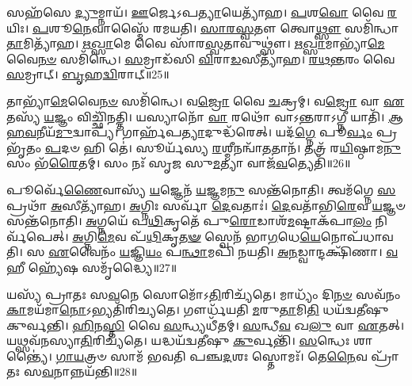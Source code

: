 𑌸𑌹᳴𑌸𑍇 \ul{𑌦𑍍𑌯𑍁}\-𑌮𑍍𑌨𑌾𑌯᳴।
\-\ul{𑌊}\-𑌰𑍍𑌜𑍇\-𑌽𑌪\-\ul{𑌤𑍍𑌯𑌾}\-𑌯𑍇𑌤𑍍𑌯𑌾᳴𑌹।
\-\ul{𑌪}\-𑌶\-\ul{𑌵𑍋} 𑌵𑍈 \ul{𑌰}\-𑌯𑌿𑌃।
\-\ul{𑌪}\-𑌶𑍂\-\ul{𑌨𑍇}\-𑌵𑌾𑌸𑍍𑌮𑍈᳴ 𑌰𑌮𑌯𑌤𑌿।
\-\ul{𑌸𑌾}\-\-\ul{𑌰}\-\-\ul{𑌸𑍍𑌵}\-𑌤𑍗 𑌤𑍍𑌵𑍋\-\ul{𑌥𑍍𑌸𑍗} 𑌸𑌮𑌿᳴𑌨𑍍𑌧𑌾\-\ul{𑌤𑌾}\-𑌮𑌿𑌤𑍍𑌯𑌾᳴𑌹।
\-\ul{𑌋}\-\-\ul{𑌖𑍍𑌸𑌾}\-𑌮𑍇 𑌵𑍈 𑌸𑌾᳴𑌰\-\ul{𑌸𑍍𑌵}\-𑌤𑌾𑌵𑍁𑌥𑍍𑌸𑍗॑।
\-\ul{𑌋}\-\-\ul{𑌖𑍍𑌸𑌾}\-𑌮𑌾𑌭𑍍𑌯𑌾᳴\-\ul{𑌮𑍇}\-𑌵𑍈\-\ul{𑌨}\-\-\ul{𑍞} 𑌸𑌮𑌿᳴𑌨𑍍𑌧𑍇।
\-\ul{𑌸}\-𑌮𑍍𑌰𑌾𑌡᳴𑌸𑌿 \ul{𑌵𑌿}\-𑌰𑌾\-\ul{𑌡}\-𑌸𑍀𑌤𑍍𑌯𑌾᳴𑌹।
\-\ul{𑌰}\-\-\ul{𑌥}\-\-\ul{𑌨𑍍𑌤}\-𑌰𑌂 𑌵𑍈 \ul{𑌸}\-𑌮𑍍𑌰𑌾𑌟𑍍।
\-\ul{𑌬𑍃}\-𑌹\-\ul{𑌦𑍍𑌵𑌿}\-𑌰𑌾𑌟𑍍॥25॥

𑌤𑌾𑌭𑍍𑌯𑌾᳴\-\ul{𑌮𑍇}\-𑌵𑍈\-\ul{𑌨}\-\-\ul{𑍞} 𑌸𑌮𑌿᳴𑌨𑍍𑌧𑍇।
𑌵\-\ul{𑌜𑍍𑌰𑍋} 𑌵𑍈 \ul{𑌚}\-𑌕𑍍𑌰𑌮𑍍।
𑌵\-\ul{𑌜𑍍𑌰𑍋} 𑌵𑌾 \ul{𑌏}\-𑌤𑌸𑍍𑌯᳴ \ul{𑌯}\-𑌜𑍍𑌞𑌂 𑌵𑌿𑌚𑍍𑌛𑌿᳴𑌨𑌤𑍍𑌤𑌿।
𑌯𑌸𑍍𑌯𑌾𑌨𑍋᳴ \ul{𑌵𑌾} 𑌰𑌥𑍋᳴ 𑌵𑌾𑌽\-\ul{𑌨𑍍𑌤}\-𑌰𑌾\-𑌽𑌗𑍍𑌨𑍀 𑌯𑌾𑌤𑌿᳴।
\-\ul{𑌆}\-\-\ul{𑌹}\-\-\ul{𑌵}\-𑌨𑍀𑌯᳴\-\ul{𑌮𑍁}\-𑌦𑍍𑌵𑌾𑌪𑍍𑌯᳴।
𑌗𑌾𑌰𑍍\mbox{}𑌹᳴𑌪\-\ul{𑌤𑍍𑌯𑌾}\-𑌦𑍁𑌦𑍍𑌧᳴𑌰𑍇𑌤𑍍।
𑌯𑌦᳴\-\ul{𑌗𑍍𑌨𑍇} 𑌪𑍂\-\ul{𑌰𑍍𑌵𑌂} 𑌪𑍍𑌰𑌭𑍃᳴𑌤𑌂 \ul{𑌪}\-𑌦𑍞 𑌹𑌿 𑌤𑍇॑।
𑌸𑍂𑌰𑍍𑌯᳴𑌸𑍍𑌯 \ul{𑌰}\-𑌶𑍍𑌮𑍀𑌨𑌨𑍍𑌵𑌾᳴\-\ul{𑌤}\-𑌤𑌾𑌨᳴।
𑌤𑌤𑍍𑌰᳴ 𑌰\-\ul{𑌯𑌿}\-𑌷𑍍𑌠𑌾𑌮\-\ul{𑌨𑍁} 𑌸𑌂 𑌭᳴\-\ul{𑌰𑍈}\-𑌤𑌮𑍍।
𑌸𑌂 𑌨𑌃᳴ 𑌸𑍃𑌜 𑌸𑍁\-\ul{𑌮}\-𑌤𑍍𑌯𑌾 𑌵𑌾𑌜᳴\-\ul{𑌵}\-𑌤𑍍𑌯𑍇𑌤𑌿᳴॥26॥

𑌪𑍂𑌰𑍍𑌵𑍇᳴\-\ul{𑌣𑍈}\-𑌵𑌾𑌸𑍍𑌯᳴ \ul{𑌯}\-𑌜𑍍𑌞𑍇𑌨᳴ \ul{𑌯}\-𑌜𑍍𑌞𑌮\-\ul{𑌨𑍁} 𑌸𑌨𑍍𑌤᳴𑌨𑍋𑌤𑌿।
𑌤𑍍𑌵𑌮᳴𑌗𑍍𑌨𑍇 \ul{𑌸}\-𑌪𑍍𑌰𑌥𑌾᳴ \ul{𑌅}\-𑌸𑍀𑌤𑍍𑌯𑌾᳴𑌹।
\-\ul{𑌅}\-𑌗𑍍𑌨𑌿𑌃 𑌸𑌰𑍍𑌵𑌾᳴ \ul{𑌦𑍇}\-𑌵𑌤𑌾𑌃॑।
\-\ul{𑌦𑍇}\-𑌵𑌤𑌾᳴𑌭𑌿\-\ul{𑌰𑍇}\-𑌵 \ul{𑌯}\-𑌜𑍍𑌞𑍞 𑌸𑌨𑍍𑌤᳴𑌨𑍋𑌤𑌿।
\-\ul{𑌅}\-𑌗𑍍𑌨𑌯𑍇᳴ 𑌪\-\ul{𑌥𑌿}\-𑌕𑍃𑌤𑍇᳴ 𑌪𑍁\-\ul{𑌰𑍋}\-𑌡𑌾𑌶᳴\-\ul{𑌮}\-𑌷𑍍𑌟𑌾\-𑌕᳴𑌪𑌾\-\ul{𑌲𑌂} 𑌨𑌿𑌰𑍍𑌵᳴𑌪𑍇𑌤𑍍।
\-\ul{𑌅}\-𑌗𑍍𑌨𑌿\-\ul{𑌮𑍇}\-𑌵 𑌪᳴\-\ul{𑌥𑌿}\-𑌕𑍃\-\ul{𑌤}\-\-\ul{𑍟} 𑌸𑍍𑌵𑍇𑌨᳴ 𑌭𑌾\-\ul{𑌗}\-𑌧𑍇\-\ul{𑌯𑍇}\-𑌨𑍋𑌪᳴𑌧𑌾𑌵𑌤𑌿।
𑌸 \ul{𑌏}\-𑌵𑍈𑌨𑌂᳴ \ul{𑌯}\-𑌜𑍍𑌞𑌿\-\ul{𑌯𑌂} 𑌪\-\ul{𑌨𑍍𑌥𑌾}\-𑌮𑌪𑌿᳴ 𑌨𑌯𑌤𑌿।
\-\ul{𑌅}\-\-\ul{𑌨}\-𑌡𑍍𑌵𑌾𑌨𑍍𑌦𑌕𑍍𑌷𑌿᳴𑌣𑌾।
\-\ul{𑌵}\-𑌹𑍀 𑌹𑍍𑌯𑍇᳴𑌷 𑌸𑌮𑍃᳴𑌦𑍍𑌧𑍍𑌯𑍈॥27॥

𑌯𑌸𑍍𑌯᳴ 𑌪𑍍𑌰𑌾𑌤𑌃 𑌸\-\ul{𑌵}\-𑌨𑍇 𑌸𑍋𑌮𑍋᳴\-𑌽\-\ul{𑌤𑌿}\-𑌰𑌿𑌚𑍍𑌯᳴𑌤𑍇।
𑌮𑌾𑌧𑍍𑌯𑌂᳴ 𑌦𑌿\-\ul{𑌨}\-\-\ul{𑍞} 𑌸𑌵᳴𑌨𑌂 \ul{𑌕𑌾}\-𑌮𑌯᳴𑌮𑌾\-\ul{𑌨𑍋}\-\-𑌽𑌭𑍍𑌯𑌤𑌿᳴𑌰𑌿𑌚𑍍𑌯𑌤𑍇।
𑌗𑍗𑌰𑍍𑌧᳴𑌯𑌤𑌿 \ul{𑌮}\-𑌰𑍁\-\ul{𑌤𑌾}\-𑌮𑌿\-\ul{𑌤𑌿} 𑌧𑌯᳴𑌦𑍍𑌵𑌤𑍀𑌷𑍁 𑌕𑍁𑌰𑍍𑌵𑌨𑍍𑌤𑌿।
\-\ul{𑌹𑌿}\-𑌨\-\ul{𑌸𑍍𑌤𑌿} 𑌵𑍈 \ul{𑌸}\-𑌨𑍍𑌧𑍍𑌯𑌧𑍀᳴𑌤𑌮𑍍।
\-\ul{𑌸}\-𑌨𑍍𑌧𑍀\-\ul{𑌵} 𑌖\-\ul{𑌲𑍁} 𑌵𑌾 \ul{𑌏}\-𑌤𑌤𑍍।
𑌯𑌥𑍍𑌸𑌵᳴𑌨𑌸𑍍𑌯𑌾\-\ul{𑌤𑌿}\-𑌰𑌿𑌚𑍍𑌯᳴𑌤𑍇।
𑌯𑌦𑍍𑌧𑌯᳴𑌦𑍍𑌵𑌤𑍀𑌷𑍁 \ul{𑌕𑍁}\-𑌰𑍍𑌵𑌨𑍍𑌤𑌿᳴।
\-\ul{𑌸}\-𑌨𑍍𑌧𑍇𑌃 𑌶𑌾𑌨𑍍𑌤𑍍𑌯𑍈॑।
\-\ul{𑌗𑌾}\-\-\ul{𑌯}\-𑌤𑍍𑌰𑍞 𑌸𑌾𑌮᳴ 𑌭𑌵𑌤𑌿 𑌪𑌞𑍍𑌚\-\ul{𑌦}\-𑌶𑌃 𑌸𑍍𑌤𑍋𑌮𑌃᳴।
𑌤𑍇\-\ul{𑌨𑍈}\-𑌵 𑌪𑍍𑌰𑌾᳴𑌤𑌃 𑌸\-\ul{𑌵}\-𑌨𑌾𑌨𑍍𑌨𑌯᳴𑌨𑍍𑌤𑌿॥28॥

